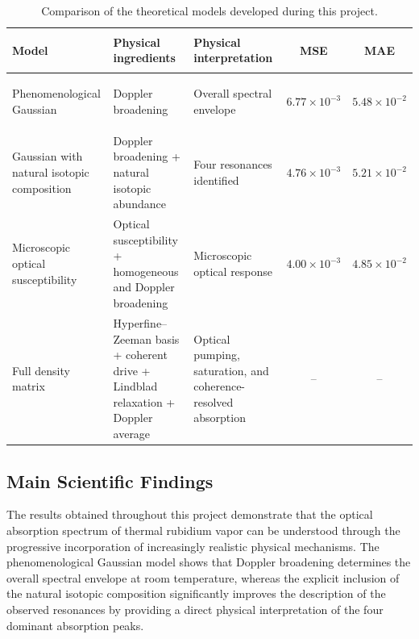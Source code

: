 \documentclass[11pt]{article}
\numberwithin{equation}{section}
\begin{document}
\begin{table}[h]
\centering
\small
\renewcommand{\arraystretch}{1.2}

\caption{Comparison of the theoretical models developed during this project.}
\label{tab:model_comparison}

\begin{tabularx}{\textwidth}{
>{\bfseries\raggedright\arraybackslash}p{3.3cm}
>{\raggedright\arraybackslash}X
>{\raggedright\arraybackslash}X
c c}
\toprule
Model &
Physical ingredients &
Physical interpretation &
MSE &
MAE \\
\midrule

Phenomenological Gaussian
&
Doppler broadening
&
Overall spectral envelope
&
$6.77\times10^{-3}$
&
$5.48\times10^{-2}$ \\

Gaussian with natural isotopic composition
&
Doppler broadening + natural isotopic abundance
&
Four resonances identified
&
$4.76\times10^{-3}$
&
$5.21\times10^{-2}$ \\

Microscopic optical susceptibility
&
Optical susceptibility + homogeneous and Doppler broadening
&
Microscopic optical response
&
$4.00\times10^{-3}$
&
$4.85\times10^{-2}$ \\

\addlinespace
Full density matrix
&
Hyperfine--Zeeman basis + coherent drive + Lindblad relaxation + Doppler average
&
Optical pumping, saturation, and coherence-resolved absorption
&
--
&
-- \\

\bottomrule
\end{tabularx}
\end{table}

\subsection{Main Scientific Findings}

The results obtained throughout this project demonstrate that the optical absorption spectrum of thermal rubidium vapor can be understood through the progressive incorporation of increasingly realistic physical mechanisms. The phenomenological Gaussian model shows that Doppler broadening determines the overall spectral envelope at room temperature, whereas the explicit inclusion of the natural isotopic composition significantly improves the description of the observed resonances by providing a direct physical interpretation of the four dominant absorption peaks.
\end{document}
